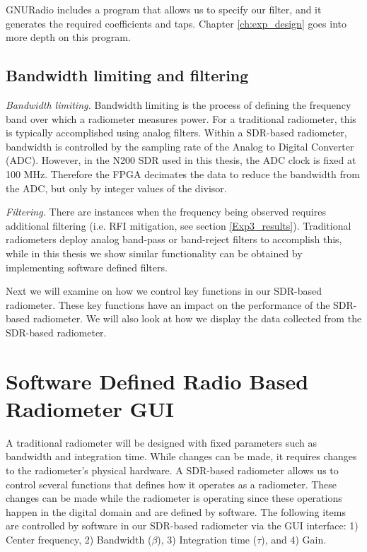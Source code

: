 


GNURadio includes a program that allows us to specify our filter, and it generates the required coefficients and taps.  Chapter \ref{ch:exp_design} goes into more depth on this program.

\subsection{Bandwidth limiting and filtering}

\emph{Bandwidth limiting.}  Bandwidth limiting is the process of defining the frequency band over which a radiometer measures power.  For a traditional radiometer, this is typically accomplished using analog filters.  Within a SDR-based radiometer, bandwidth is controlled by the sampling rate of the Analog to Digital Converter (ADC).  However, in the N200 SDR used in this thesis, the ADC clock is fixed at 100 MHz.  Therefore the FPGA decimates the data to reduce the bandwidth from the ADC, but only by integer values of the divisor.

\emph{Filtering.}  There are instances when the frequency being observed requires additional filtering (i.e. RFI mitigation, see section \ref{Exp3_results}).  Traditional radiometers deploy analog band-pass or band-reject filters to accomplish this, while in this thesis we show similar functionality can be obtained by implementing software defined filters.

Next we will examine on how we control key functions in our SDR-based radiometer.  These key functions have an impact on the performance of the SDR-based radiometer.  We will also look at how we display the data collected from the SDR-based radiometer.

\section{Software Defined Radio Based Radiometer GUI}

A traditional radiometer will be designed with fixed parameters such as bandwidth and integration time.  While changes can be made, it requires changes to the radiometer's physical hardware.  A SDR-based radiometer allows us to control several functions that defines how it operates as a radiometer.  These changes can be made while the radiometer is operating since these operations happen in the digital domain and are defined by software. The following items are controlled by software in our SDR-based radiometer via the GUI interface: 1) Center frequency, 2) Bandwidth ($\beta$), 3) Integration time ($\tau$), and 4) Gain.

